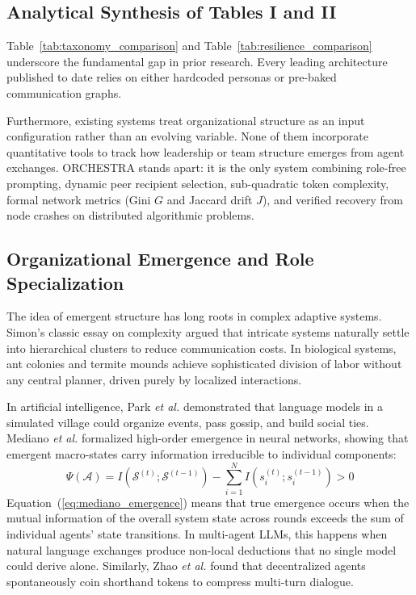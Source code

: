 \documentclass{ieeeaccess}
\begin{document}
\subsection{Analytical Synthesis of Tables I and II}
Table~\ref{tab:taxonomy_comparison} and Table~\ref{tab:resilience_comparison} underscore the fundamental gap in prior research. Every leading architecture published to date relies on either hardcoded personas or pre-baked communication graphs. 

Furthermore, existing systems treat organizational structure as an input configuration rather than an evolving variable. None of them incorporate quantitative tools to track how leadership or team structure emerges from agent exchanges. ORCHESTRA stands apart: it is the only system combining role-free prompting, dynamic peer recipient selection, sub-quadratic token complexity, formal network metrics (Gini $G$ and Jaccard drift $J$), and verified recovery from node crashes on distributed algorithmic problems.

\subsection{Organizational Emergence and Role Specialization}
The idea of emergent structure has long roots in complex adaptive systems. Simon's classic essay on complexity \cite{simon1962architecture} argued that intricate systems naturally settle into hierarchical clusters to reduce communication costs. In biological systems, ant colonies and termite mounds \cite{bonabeau1999swarm} achieve sophisticated division of labor without any central planner, driven purely by localized interactions.

In artificial intelligence, Park \emph{et al.} \cite{park2023generative} demonstrated that language models in a simulated village could organize events, pass gossip, and build social ties. Mediano \emph{et al.} \cite{mediano2025emergence} formalized high-order emergence in neural networks, showing that emergent macro-states carry information irreducible to individual components:
\begin{equation}
\label{eq:mediano_emergence}
\Psi(\mathcal{A}) = I(\mathcal{S}^{(t)}; \mathcal{S}^{(t-1)}) - \sum_{i=1}^N I(s_i^{(t)}; s_i^{(t-1)}) > 0
\end{equation}
Equation~(\ref{eq:mediano_emergence}) means that true emergence occurs when the mutual information of the overall system state across rounds exceeds the sum of individual agents' state transitions. In multi-agent LLMs, this happens when natural language exchanges produce non-local deductions that no single model could derive alone. Similarly, Zhao \emph{et al.} \cite{zhao2025protocol} found that decentralized agents spontaneously coin shorthand tokens to compress multi-turn dialogue.
\end{document}
